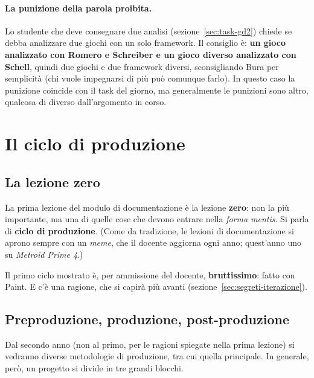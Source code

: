 \paragraph{La punizione della parola proibita.} Lo studente che deve
consegnare due analisi (sezione~\ref{sec:task-gd2}) chiede se debba
analizzare due giochi con un solo framework. Il consiglio è: \textbf{un gioco
analizzato con Romero e Schreiber e un gioco diverso analizzato con Schell},
quindi due giochi e due framework diversi, sconsigliando Bura per semplicità
(chi vuole impegnarsi di più può comunque farlo). In questo caso la punizione
coincide con il task del giorno, ma generalmente le punizioni sono altro,
qualcosa di diverso dall'argomento in corso.

\section{Il ciclo di produzione}
\label{sec:ciclo-produzione}

\subsection{La lezione zero}

La prima lezione del modulo di documentazione è la lezione \textbf{zero}: non
la più importante, ma una di quelle cose che devono entrare nella
\emph{forma mentis}. Si parla di \textbf{ciclo di produzione}. (Come da
tradizione, le lezioni di documentazione si aprono sempre con un
\emph{meme}, che il docente aggiorna ogni anno; quest'anno uno su
\emph{Metroid Prime 4}.)

Il primo ciclo mostrato è, per ammissione del docente, \textbf{bruttissimo}:
fatto con Paint. E c'è una ragione, che si capirà più avanti
(sezione~\ref{sec:segreti-iterazione}).

\subsection{Preproduzione, produzione, post-produzione}



Dal secondo anno (non al primo, per le ragioni spiegate nella prima lezione)
si vedranno diverse metodologie di produzione, tra cui quella principale. In
generale, però, un progetto si divide in tre grandi blocchi.

